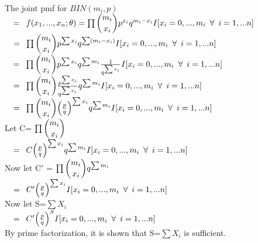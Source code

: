 \\

The joint pmf for $BIN(m_i,p)$ \\

$\quad = \enskip f(x_1,...,x_n; \mathbf{\theta}) = \prod \dbinom{m_i}{x_i} p^{x_i}q^{m_i - x_i} I[x_i = 0,...,m_i \enskip \forall \enskip i=1,...n] $ \\

$\quad = \enskip \prod \dbinom{m_i}{x_i} p^{\sum{x_i}}q^{\sum(m_i - x_i)} I[x_i = 0,...,m_i \enskip \forall \enskip i=1,...n] $ \\

$\quad = \enskip \prod \dbinom{m_i}{x_i} p^{\sum{x_i}} q^{\sum{m_i}} \frac{1}{q^{\sum{x_i}}} I[x_i = 0,...,m_i \enskip \forall \enskip i=1,...n] $ \\

$\quad = \enskip \prod \dbinom{m_i}{x_i} \frac{p^{\sum{x_i}}}{q^{\sum{x_i}}}q^{\sum{m_i}} I[x_i = 0,...,m_i \enskip \forall \enskip i=1,...n] $ \\

$\quad = \enskip \prod \dbinom{m_i}{x_i} \Big( \frac{p}{q} \Big)^{\sum{x_i}} q^{\sum{m_i}} I[x_i = 0,...,m_i \enskip \forall \enskip i=1,...n] $ \\

Let C= $\prod \dbinom{m_i}{x_i}$\\

$\quad = \enskip C \Big( \frac{p}{q} \Big)^{\sum{x_i}}q^{\sum{m_i}} I[x_i = 0,...,m_i \enskip \forall \enskip i=1,...n] $ \\

Now let C$'$ = $\prod \dbinom{m_i}{x_i}q^{\sum{m_i}}$\\

$\quad = \enskip C' \Big( \frac{p}{q} \Big)^{\sum{x_i}} I[x_i = 0,...,m_i \enskip \forall \enskip i=1,...n] $ \\

Now let S=$\sum{X_i}$ \\

$\quad = \enskip  C' \Big( \frac{p}{q} \Big)^{S} I[x_i = 0,...,m_i \enskip \forall \enskip i=1,...n]$ \\

By prime factorization, it is shown that S=$\sum{X_i}$ is sufficient.